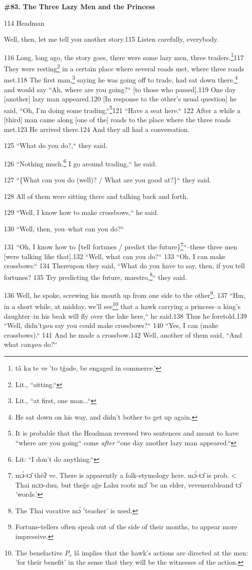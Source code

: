 
\textbf{\#83. The Three Lazy Men and the Princess }

114 Headman

Well, then, let me tell you another story.115 Listen carefully, everybody.

116 Long, long ago, the story goes, there were some lazy men, three traders.\footnote{tâ k\emph{a} te ve 'to tg̈ade, be engaged in commerce.'}117
They were resting\footnote{Lit., ``sitting.``} in a certain place where several roads met, where three roads
met.118 The first man,\footnote{Lit., ``at first, one man...``} saying he was going off to trade, had sat down there,\footnote{He sat down on his way, and didn't bother to get up again.}
and would say ``Ah, where are you going?`` [to those who passed].119
One day [another] lazy man appeared.120 [In response to the other's usual question]
he said, ``Oh, I'm doing some trading.``\footnote{It is probable that the Headman reversed two sentences and meant to have ``where are you going`` come \textit{after} ``one day another lazy man appeared.``}121 ``Have
a seat here.`` 122 After a while a [third] man came along [one of the]
roads to the place where the three roads met.123 He arrived there.124 And they
all had a conversation.

125 ``What do you do?,`` they said.

126 ``Nothing much.\footnote{Lit: ``I don't do anything.``} I go around trading,`` he said.

127 ``\{What can you do (well)? / What are you good at?\}`` they
said.

128 All of them were sitting there and talking back and forth.

129 ``Well, I know how to make crossbows,`` he said.

130 ``Well, then, you--what can you do?``

131 ``Oh, I know how to \{tell fortunes / predict the future\}\footnote{mɔ́-tɔ̂ thèʔ ve. There is apparently a folk-etymology here. mɔ́-tɔ̂ is prob. < Thai mɔɔ-duu, but theg̈e ag̈e Lahu roots mɔ̂ 'be an elder, vevenerableand tɔ̂ 'words.'}``--these
three men [were talking like that].132 ``Well, what can you do?``
133 ``Oh, I can make crossbows.`` 134 Thereupon they said, ``What
do you have to say, then, if you tell fortunes? 135 Try predicting the future,
maestro,\footnote{The Thai vocative mɔ́ 'teacher' is used.}`` they said.

136 Well, he spoke, screwing his mouth up from one side to the other\footnote{Fortune-tellers often speak out of the side of their months, to appear more impressive.}: 137 ``Hm,
in a short while, at midday, we'll see\footnote{The benefactive $P_v$ lâ implies that the hawk's actions are directed at the men: 'for their benefit' in the sense that they will be the witnesses of the action.} that a hawk carrying a princess--a king's
daughter--in his beak will fly over the lake here,`` he said.138 Thus he
foretold.139 ``Well, didn't\textit{you} say you could make crossbows?``
140 ``Yes, I can (make crossbows).`` 141 And he made a crossbow.142
Well, another of them said, ``And what can\textit{you} do?``

